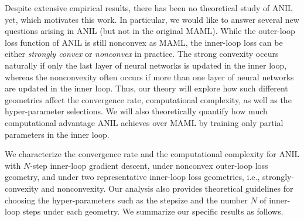 \documentclass{osudissert96}
\begin{document}
Despite extensive empirical results, there has been no theoretical study of ANIL yet, which motivates this work. In particular, we would like to answer several new questions arising in ANIL (but not in the original MAML). While the outer-loop loss function of ANIL is still nonconvex as MAML, the inner-loop loss can be either  {\em strongly convex} or {\em nonconvex} in practice. The strong convexity  occurs naturally if only the last layer of neural networks is updated in the inner loop, whereas the nonconvexity often occurs if more than one layer of neural networks are updated in the inner loop. Thus, our theory will explore how such different geometries affect the convergence rate, computational complexity, as well as the hyper-parameter selections.  We will also theoretically quantify how much computational advantage ANIL achieves over MAML by training only partial parameters in the inner loop. 

\vspace{0.15cm}
 We characterize the convergence rate and the computational complexity for ANIL with $N$-step inner-loop gradient descent, under nonconvex outer-loop loss geometry, and under two representative inner-loop loss geometries, i.e., strongly-convexity and nonconvexity. Our analysis also provides theoretical guidelines for choosing the hyper-parameters such as the stepsize and the number $N$ of inner-loop steps under each geometry. We summarize our specific results as follows.
\end{document}
